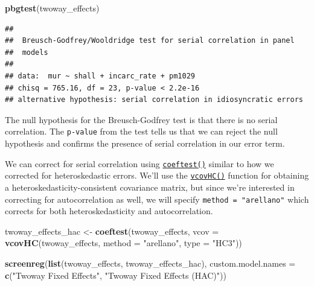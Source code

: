 \documentclass[]{article}
\newenvironment{Shaded}{\begin{snugshade}}{\end{snugshade}}
\newcommand{\KeywordTok}[1]{\textcolor[rgb]{0.13,0.29,0.53}{\textbf{{#1}}}}
\newcommand{\DataTypeTok}[1]{\textcolor[rgb]{0.13,0.29,0.53}{{#1}}}
\newcommand{\StringTok}[1]{\textcolor[rgb]{0.31,0.60,0.02}{{#1}}}
\newcommand{\NormalTok}[1]{{#1}}
\theoremstyle{definition}
\theoremstyle{definition}
\theoremstyle{remark}
\begin{document}
\begin{Shaded}
\begin{Highlighting}[]
\KeywordTok{pbgtest}\NormalTok{(twoway_effects)}
\end{Highlighting}
\end{Shaded}

\begin{verbatim}
## 
##  Breusch-Godfrey/Wooldridge test for serial correlation in panel
##  models
## 
## data:  mur ~ shall + incarc_rate + pm1029
## chisq = 765.16, df = 23, p-value < 2.2e-16
## alternative hypothesis: serial correlation in idiosyncratic errors
\end{verbatim}

The null hypothesis for the Breusch-Godfrey test is that there is no
serial correlation. The \texttt{p-value} from the test tells us that we
can reject the null hypothesis and confirms the presence of serial
correlation in our error term.

We can correct for serial correlation using
\href{http://bit.ly/r_coeftest}{\texttt{coeftest()}} similar to how we
corrected for heteroskedastic errors. We'll use the
\href{http://bit.ly/r_vcovHC}{\texttt{vcovHC()}} function for obtaining
a heteroskedasticity-consistent covariance matrix, but since we're
interested in correcting for autocorrelation as well, we will specify
\texttt{method\ =\ "arellano"} which corrects for both
heteroskedasticity and autocorrelation.

\begin{Shaded}
\begin{Highlighting}[]
\NormalTok{twoway_effects_hac <-}\StringTok{ }\KeywordTok{coeftest}\NormalTok{(twoway_effects, }
                               \DataTypeTok{vcov =} \KeywordTok{vcovHC}\NormalTok{(twoway_effects, }
                                             \DataTypeTok{method =} \StringTok{"arellano"}\NormalTok{, }
                                             \DataTypeTok{type =} \StringTok{"HC3"}\NormalTok{))}

\KeywordTok{screenreg}\NormalTok{(}\KeywordTok{list}\NormalTok{(twoway_effects, twoway_effects_hac),}
          \DataTypeTok{custom.model.names =} \KeywordTok{c}\NormalTok{(}\StringTok{"Twoway Fixed Effects"}\NormalTok{, }
                                 \StringTok{"Twoway Fixed Effects (HAC)"}\NormalTok{))}
\end{Highlighting}
\end{Shaded}
\end{document}
